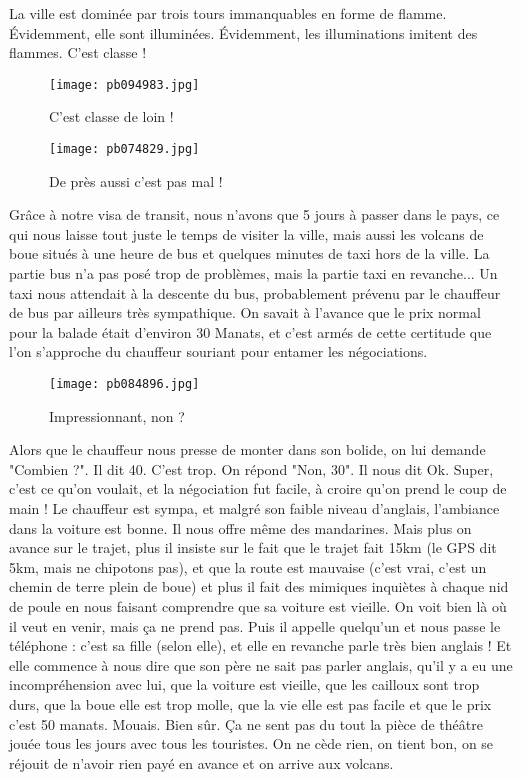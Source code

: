 \documentclass{book}
\begin{document}
La ville est dominée par trois tours immanquables en forme de flamme. Évidemment, elle sont illuminées. Évidemment, les illuminations imitent des flammes. C'est classe !


\begin{figure}[h]
\centering
\texttt{[image: pb094983.jpg]}
\caption*{C'est classe de loin !}
\end{figure}


\begin{wrapfigure}{l}{0.55\textwidth}
\centering
\texttt{[image: pb074829.jpg]}
\caption*{De près aussi c'est pas mal !}
\end{wrapfigure}

Grâce à notre visa de transit, nous n'avons que 5 jours à passer dans le pays, ce qui nous laisse tout juste le temps de visiter la ville, mais aussi les volcans de boue situés à une heure de bus et quelques minutes de taxi hors de la ville. La partie bus n'a pas posé trop de problèmes, mais la partie taxi en revanche... Un taxi nous attendait à la descente du bus, probablement prévenu par le chauffeur de bus par ailleurs très sympathique. On savait à l'avance que le prix normal pour la balade était d'environ 30 Manats, et c'est armés de cette certitude que l'on s'approche du chauffeur souriant pour entamer les négociations.


\begin{figure}[h]
\centering
\texttt{[image: pb084896.jpg]}
\caption*{Impressionnant, non ?}
\end{figure}

Alors que le chauffeur nous presse de monter dans son bolide, on lui demande "Combien ?". Il dit 40. C'est trop. On répond "Non, 30". Il nous dit Ok. Super, c'est ce qu'on voulait, et la négociation fut facile, à croire qu'on prend le coup de main ! Le chauffeur est sympa, et malgré son faible niveau d'anglais, l'ambiance dans la voiture est bonne. Il nous offre même des mandarines. Mais plus on avance sur le trajet, plus il insiste sur le fait que le trajet fait 15km (le GPS dit 5km, mais ne chipotons pas), et que la route est mauvaise (c'est vrai, c'est un chemin de terre plein de boue) et plus il fait des mimiques inquiètes à chaque nid de poule en nous faisant comprendre que sa voiture est vieille. On voit bien là où il veut en venir, mais ça ne prend pas. Puis il appelle quelqu'un et nous passe le téléphone : c'est sa fille (selon elle), et elle en revanche parle très bien anglais ! Et elle commence à nous dire que son père ne sait pas parler anglais, qu'il y a eu une incompréhension avec lui, que la voiture est vieille, que les cailloux sont trop durs, que la boue elle est trop molle, que la vie elle est pas facile et que le prix c'est 50 manats. Mouais. Bien sûr. Ça ne sent pas du tout la pièce de théâtre jouée tous les jours avec tous les touristes. On ne cède rien, on tient bon, on se réjouit de n'avoir rien payé en avance et on arrive aux volcans.
\end{document}
